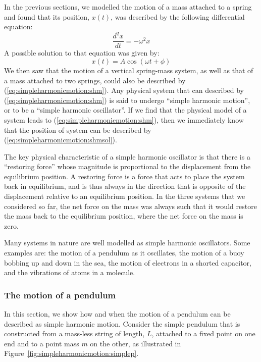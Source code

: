 In the previous sections, we modelled the motion of a mass attached to a spring and found that its position, $x(t)$, was described by the following differential equation:
\begin{equation}
\label{eq:simpleharmonicmotion:shm}
\boxed{\frac{d^2x}{dt} = -\omega^2x}
\end{equation}
A possible solution to that equation was given by:
\begin{equation}
\label{eq:simpleharmonicmotion:shmsol}
\boxed{x(t) = A\cos(\omega t+ \phi)}
\end{equation}
We then saw that the motion of a vertical spring-mass system, as well as that of a mass attached to two springs, could also be described by (\ref{eq:simpleharmonicmotion:shm}). Any physical system that can described by (\ref{eq:simpleharmonicmotion:shm}) is said to undergo ``simple harmonic motion'', or to be a ``simple harmonic oscillator''. If we find that the physical model of a system leads to (\ref{eq:simpleharmonicmotion:shm}), then we immediately know that the position of system can be described by (\ref{eq:simpleharmonicmotion:shmsol}).

The key physical characteristic of a simple harmonic oscillator is that there is a ``restoring force'' whose magnitude is proportional to the displacement from the equilibrium position. A restoring force is a force that acts to place the system back in equilibrium, and is thus always in the direction that is opposite of the displacement relative to an equilibrium position. In the three systems that we considered so far, the net force on the mass was always such that it would restore the mass back to the equilibrium position, where the net force on the mass is zero.

Many systems in nature are well modelled as simple harmonic oscillators. Some examples are: the motion of a pendulum as it oscillates, the motion of a buoy bobbing up and down in the sea, the motion of electrons in a shorted capacitor, and the vibrations of atoms in a molecule.

\subsubsection{The motion of a pendulum}

In this section, we show how and when the motion of a pendulum can be described as simple harmonic motion. Consider the simple pendulum that is constructed from a mass-less string of length, $L$, attached to a fixed point on one end and to a point mass $m$ on the other, as illustrated in Figure~\ref{fig:simpleharmonicmotion:simplep}.

